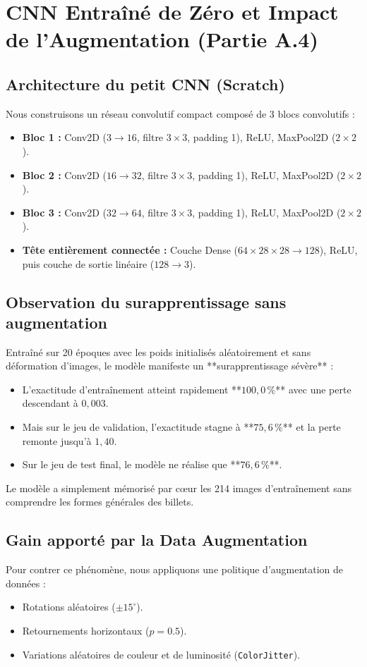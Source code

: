 \documentclass[11pt,a4paper]{article}
\begin{document}
\newpage
\section{CNN Entraîné de Zéro et Impact de l'Augmentation (Partie A.4)}

\subsection{Architecture du petit CNN (Scratch)}
Nous construisons un réseau convolutif compact composé de 3 blocs convolutifs :
\begin{itemize}
    \item \textbf{Bloc 1 :} Conv2D ($3 \rightarrow 16$, filtre $3\times 3$, padding 1), ReLU, MaxPool2D ($2\times 2$).
    \item \textbf{Bloc 2 :} Conv2D ($16 \rightarrow 32$, filtre $3\times 3$, padding 1), ReLU, MaxPool2D ($2\times 2$).
    \item \textbf{Bloc 3 :} Conv2D ($32 \rightarrow 64$, filtre $3\times 3$, padding 1), ReLU, MaxPool2D ($2\times 2$).
    \item \textbf{Tête entièrement connectée :} Couche Dense ($64 \times 28 \times 28 \rightarrow 128$), ReLU, puis couche de sortie linéaire ($128 \rightarrow 3$).
\end{itemize}

\subsection{Observation du surapprentissage sans augmentation}
Entraîné sur 20 époques avec les poids initialisés aléatoirement et sans déformation d'images, le modèle manifeste un **surapprentissage sévère** :
\begin{itemize}
    \item L'exactitude d'entraînement atteint rapidement **$100{,}0\,\%$** avec une perte descendant à $0{,}003$.
    \item Mais sur le jeu de validation, l'exactitude stagne à **$75{,}6\,\%$** et la perte remonte jusqu'à $1{,}40$.
    \item Sur le jeu de test final, le modèle ne réalise que **$76{,}6\,\%$**.
\end{itemize}
Le modèle a simplement mémorisé par cœur les 214 images d'entraînement sans comprendre les formes générales des billets.

\subsection{Gain apporté par la Data Augmentation}
Pour contrer ce phénomène, nous appliquons une politique d'augmentation de données :
\begin{itemize}
    \item Rotations aléatoires ($\pm 15^\circ$).
    \item Retournements horizontaux ($p=0.5$).
    \item Variations aléatoires de couleur et de luminosité (\texttt{ColorJitter}).
\end{itemize}
\end{document}
